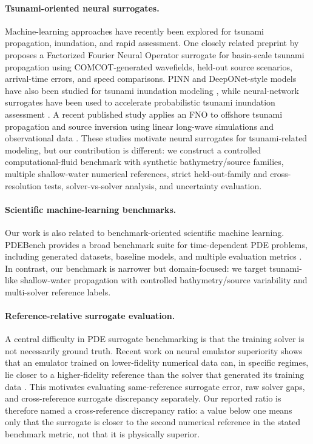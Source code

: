 \paragraph{Tsunami-oriented neural surrogates.}
Machine-learning approaches have recently been explored for tsunami propagation, inundation, and rapid assessment. One closely related preprint by \citet{kim2026ffno_tsunami} proposes a Factorized Fourier Neural Operator surrogate for basin-scale tsunami propagation using COMCOT-generated wavefields, held-out source scenarios, arrival-time errors, and speed comparisons. PINN and DeepONet-style models have also been studied for tsunami inundation modeling \citep{brecht2025pinn_tsunami}, while neural-network surrogates have been used to accelerate probabilistic tsunami inundation assessment \citep{fukutani2025prob_tsunami}. A recent published study applies an FNO to offshore tsunami propagation and source inversion using linear long-wave simulations and observational data \citep{someya2026tsunamiNO}. These studies motivate neural surrogates for tsunami-related modeling, but our contribution is different: we construct a controlled computational-fluid benchmark with synthetic bathymetry/source families, multiple shallow-water numerical references, strict held-out-family and cross-resolution tests, solver-vs-solver analysis, and uncertainty evaluation.

\paragraph{Scientific machine-learning benchmarks.}
Our work is also related to benchmark-oriented scientific machine learning. PDEBench provides a broad benchmark suite for time-dependent PDE problems, including generated datasets, baseline models, and multiple evaluation metrics \citep{takamoto2022pdebench}. In contrast, our benchmark is narrower but domain-focused: we target tsunami-like shallow-water propagation with controlled bathymetry/source variability and multi-solver reference labels.

\paragraph{Reference-relative surrogate evaluation.}
A central difficulty in PDE surrogate benchmarking is that the training solver is not necessarily ground truth. Recent work on neural emulator superiority shows that an emulator trained on lower-fidelity numerical data can, in specific regimes, lie closer to a higher-fidelity reference than the solver that generated its training data \citep{koehler2026emulator}. This motivates evaluating same-reference surrogate error, raw solver gaps, and cross-reference surrogate discrepancy separately. Our reported ratio is therefore named a cross-reference discrepancy ratio: a value below one means only that the surrogate is closer to the second numerical reference in the stated benchmark metric, not that it is physically superior.


